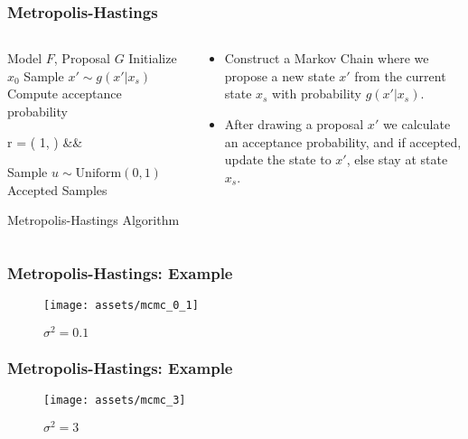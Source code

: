\documentclass{beamer}
\newenvironment{nospaceflalign*}
 {\setlength{\abovedisplayskip}{0pt}\setlength{\belowdisplayskip}{0pt}%
  \csname flalign*\endcsname}
 {\csname endflalign*\endcsname\ignorespacesafterend}
\begin{document}
\begin{frame}
\frametitle{Metropolis-Hastings}
  \begin{columns}
  \begin{column}{0.5\textwidth}
  \begin{algorithm}[H]
  \scriptsize
  \begin{algorithmic}[1]
    \REQUIRE Model $F$, Proposal $G$
    \STATE Initialize $x_0$
      \STATE Sample $x' \sim g(x'|x_s)$
      \STATE Compute acceptance probability
        \begin{nospaceflalign*}
          r = \min\left( 1, \;   \right) &&
        \end{nospaceflalign*}
      \STATE Sample $u \sim \text{Uniform}(0, 1)$
      \ELSE
      \ENDIF
    \ENDFOR
    \ENSURE Accepted Samples
  \end{algorithmic}
  \caption{Metropolis-Hastings Algorithm}
  \end{algorithm}
  \end{column}
  \begin{column}{0.5\textwidth}
    \begin{itemize}
      \item Construct a Markov Chain where we propose a new state $x'$ from the
      current state $x_s$ with probability $g(x'|x_s)$.
      \item After drawing a proposal $x'$ we calculate an acceptance probability, and
      if accepted, update the state to $x'$, else stay at state $x_s$.
    \end{itemize}
  \end{column}
  \end{columns}
\end{frame}


\begin{frame}
  \frametitle{Metropolis-Hastings: Example}
  \begin{figure}
    \centering
    \texttt{[image: assets/mcmc\_0\_1]}
    \caption{$\sigma^2 = 0.1$}
  \end{figure}
\end{frame}

\begin{frame}
  \frametitle{Metropolis-Hastings: Example}
  \begin{figure}
    \centering
    \texttt{[image: assets/mcmc\_3]}
    \caption{$\sigma^2 = 3$}
  \end{figure}
\end{frame}
\end{document}
